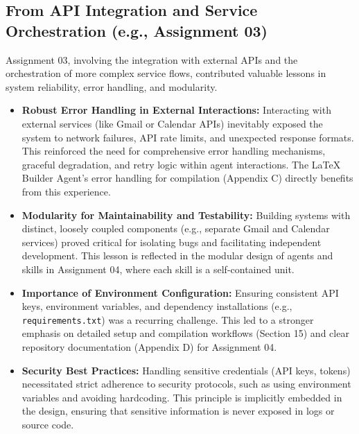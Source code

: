 \documentclass{custom-academic-template}
\begin{document}
\subsection{From API Integration and Service Orchestration (e.g., Assignment 03)}
Assignment 03, involving the integration with external APIs and the orchestration of more complex service flows, contributed valuable lessons in system reliability, error handling, and modularity.
\begin{itemize}
    \item \textbf{Robust Error Handling in External Interactions:} Interacting with external services (like Gmail or Calendar APIs) inevitably exposed the system to network failures, API rate limits, and unexpected response formats. This reinforced the need for comprehensive error handling mechanisms, graceful degradation, and retry logic within agent interactions. The LaTeX Builder Agent's error handling for compilation (Appendix C) directly benefits from this experience.
    \item \textbf{Modularity for Maintainability and Testability:} Building systems with distinct, loosely coupled components (e.g., separate Gmail and Calendar services) proved critical for isolating bugs and facilitating independent development. This lesson is reflected in the modular design of agents and skills in Assignment 04, where each skill is a self-contained unit.
    \item \textbf{Importance of Environment Configuration:} Ensuring consistent API keys, environment variables, and dependency installations (e.g., \texttt{requirements.txt}) was a recurring challenge. This led to a stronger emphasis on detailed setup and compilation workflows (Section 15) and clear repository documentation (Appendix D) for Assignment 04.
    \item \textbf{Security Best Practices:} Handling sensitive credentials (API keys, tokens) necessitated strict adherence to security protocols, such as using environment variables and avoiding hardcoding. This principle is implicitly embedded in the design, ensuring that sensitive information is never exposed in logs or source code.
\end{itemize}
\end{document}
